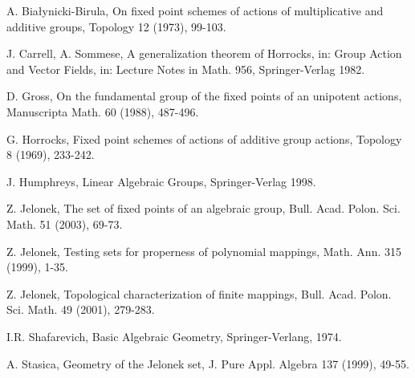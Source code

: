 \documentclass{amsproc}
\begin{document}
\begin{thebibliography}{99}

 A. Bia\l ynicki-Birula, On fixed point schemes of actions of multiplicative
and additive  groups, Topology 12 (1973), 99-103.

 J. Carrell, A. Sommese, A generalization theorem of Horrocks, in: Group Action and Vector Fields, in: Lecture Notes in Math. 956, Springer-Verlag 1982.

 D. Gross, On the fundamental group of the fixed points of an unipotent
actions, Manuscripta Math. 60 (1988), 487-496.

 G. Horrocks, Fixed point schemes of actions of
additive  group actions, Topology 8 (1969), 233-242.

 J. Humphreys, Linear Algebraic Groups, Springer-Verlag 1998.

 Z. Jelonek,  The set of fixed points of an algebraic group, Bull.
Acad. Polon. Sci. Math. 51 (2003), 69-73.

 Z. Jelonek,
Testing sets for properness of polynomial mappings, Math. Ann. 315 (1999), 1-35.

 Z. Jelonek, Topological characterization of finite mappings, Bull.
Acad. Polon. Sci. Math. 49 (2001), 279-283.

 I.R. Shafarevich, Basic Algebraic Geometry,  Springer-Verlang, 1974.

 A. Stasica, Geometry of the Jelonek set, J. Pure Appl. Algebra 137 (1999), 49-55.

\end{thebibliography}
\end{document}
